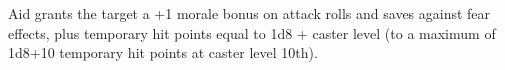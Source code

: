 \spelldatastart
{}
\spelldataend

Aid grants the target a +1 morale bonus on attack rolls and saves against fear effects, plus temporary hit points equal to 1d8 + caster level (to a maximum of 1d8+10 temporary hit points at caster level 10th).
\newline
\newline
\newline
\newline
\newline
\newline
\spellfoot


